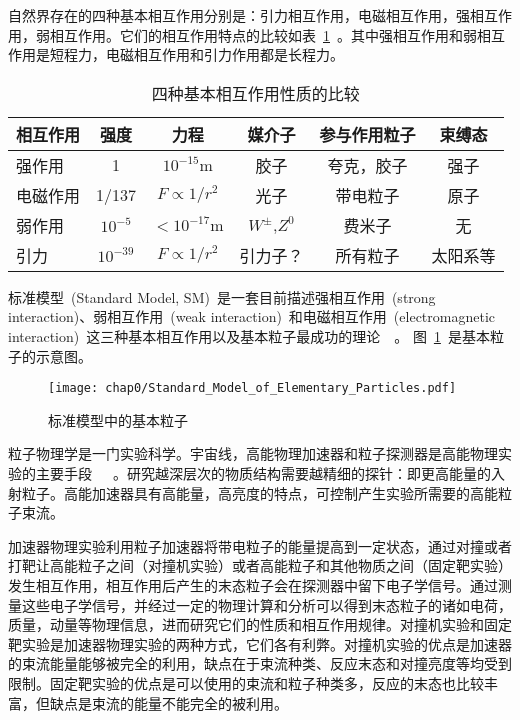自然界存在的四种基本相互作用分别是：引力相互作用，电磁相互作用，强相互作用，弱相互作用。它们的相互作用特点的比较如表~\ref{tbl:interaction}~。其中强相互作用和弱相互作用是短程力，电磁相互作用和引力作用都是长程力。

\begin{table}[h]
    \centering
    \caption{\label{tbl:interaction} 四种基本相互作用性质的比较}
    \footnotesize
    \begin{tabular}{lccccc}
        \hline
        相互作用& 强度& 力程& 媒介子& 参与作用粒子& 束缚态 \\
        \hline
        强作用& 1& $10^{-15}$m& 胶子& 夸克，胶子& 强子 \\
        电磁作用& 1/137& $F \propto 1/r^{2}$& 光子& 带电粒子& 原子 \\
        弱作用& $10^{-5}$& $<10^{-17}$m& $W^{\pm}$,$Z^{0}$& 费米子& 无 \\
        引力& $10^{-39}$&  $F \propto 1/r^{2}$& 引力子？& 所有粒子& 太阳系等\\
        \hline
    \end{tabular}
\end{table}



标准模型~(Standard Model, SM)~是一套目前描述强相互作用~(strong interaction)、弱相互作用~(weak interaction)~和电磁相互作用~(electromagnetic interaction)~这三种基本相互作用以及基本粒子最成功的理论~\cite{duds2015}~\cite{S.Weinberg:1967}。
图~\ref{fig:standard_model_particle}~是基本粒子的示意图。
\begin{figure}[!h]
  \centering
  \texttt{[image: chap0/Standard\_Model\_of\_Elementary\_Particles.pdf]}
  \caption{标准模型中的基本粒子}
  \label{fig:standard_model_particle}
\end{figure}

粒子物理学是一门实验科学。宇宙线，高能物理加速器和粒子探测器是高能物理实验的主要手段~\cite{tangxw1982}~\cite{xukz1981}~\cite{xieyg2003}\cite{xuefj2003}。研究越深层次的物质结构需要越精细的探针：即更高能量的入射粒子。高能加速器具有高能量，高亮度的特点，可控制产生实验所需要的高能粒子束流。

加速器物理实验利用粒子加速器将带电粒子的能量提高到一定状态，通过对撞或者打靶让高能粒子之间（对撞机实验）或者高能粒子和其他物质之间（固定靶实验）发生相互作用，相互作用后产生的末态粒子会在探测器中留下电子学信号。通过测量这些电子学信号，并经过一定的物理计算和分析可以得到末态粒子的诸如电荷，质量，动量等物理信息，进而研究它们的性质和相互作用规律。对撞机实验和固定靶实验是加速器物理实验的两种方式，它们各有利弊。对撞机实验的优点是加速器的束流能量能够被完全的利用，缺点在于束流种类、反应末态和对撞亮度等均受到限制。固定靶实验的优点是可以使用的束流和粒子种类多，反应的末态也比较丰富，但缺点是束流的能量不能完全的被利用。

